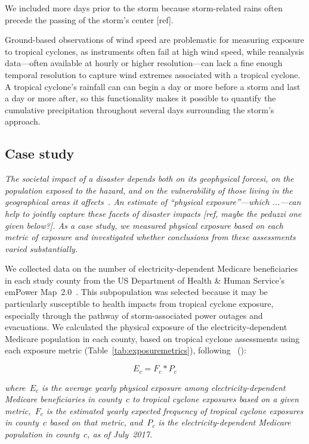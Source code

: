 We included more days prior to the storm because
storm-related rains often precede the passing of the storm's center [ref]. 

Ground-based observations of wind speed are problematic for measuring exposure
to tropical cyclones, as instruments often fail at high wind speed, while
reanalysis data---often available at hourly or higher resolution---can lack a
fine enough temporal resolution to capture wind extremes associated with a
tropical cyclone. 
A tropical cyclone's rainfall can can begin a day or more before a
storm and last a day or more after, so this functionality makes it possible to
quantify the cumulative precipitation throughout several days surrounding the
storm's approach. 

\subsection*{Case study}

\textit{The societal impact of a disaster depends both on its geophysical
forcesi, on the population exposed to the hazard, and on the vulnerability of
those living in the geographical areas it
affects~\parencite{chakraborty2005population, anderson2003community,
cutter1996vulnerability}. An estimate of ``physical exposure''---which
...---can help to jointly capture these facets of disaster impacts [ref, maybe
the peduzzi one given below?]. As a case study, we measured physical exposure
based on each metric of exposure and investigated whether conclusions from
these assessments varied substantially.}

We collected data on the number of electricity-dependent Medicare beneficiaries
in each study county from the \ac{US} Department of Health \& Human Service's
emPower Map~2.0~\parencite{empower}. This subpopulation was selected because it
may be particularly susceptible to health impacts from tropical cyclone
exposure, especially through the pathway of storm-associated power outages and
evacuations. We calculated the physical exposure of the electricity-dependent
Medicare population in each county, based on tropical cyclone assessments using
each exposure metric (Table~\ref{tab:exposuremetrics}), following
\citeauthor*{peduzzi2009assessing}~(\citeyear{peduzzi2009assessing}):

\begin{equation}
E_c = F_c * P_c
\end{equation}

\textit{\noindent where~$E_c$ is the average yearly physical exposure among
electricity-dependent Medicare beneficiaries in county~$c$ to tropical cyclone
exposures based on a given metric,~$F_c$ is the estimated yearly expected
frequency of tropical cyclone exposures in county~$c$ based on that metric,
and~$P_c$ is the electricity-dependent Medicare population in
county~$c$, as of July~2017.}



